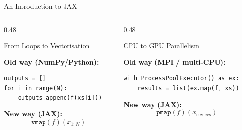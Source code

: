 \documentclass{beamer}
\begin{document}
\begin{frame}[fragile]{An Introduction to JAX}
\begin{columns}[T,totalwidth=\textwidth]
\begin{column}{0.48\textwidth}
\begin{block}{From Loops to Vectorisation}
\scriptsize

\textbf{Old way (NumPy/Python):}
\vspace{-0.5em}
\begin{verbatim}
outputs = []
for i in range(N):
    outputs.append(f(xs[i]))
\end{verbatim}
\vspace{-0.5em}
\textbf{New way (JAX):}
\vspace{-0.5em}
\[
\texttt{vmap}(f)(x_{1:N})
\]
\vspace{-1.5em}
\end{block}
\end{column}

\begin{column}{0.48\textwidth}
\begin{block}{CPU to GPU Parallelism}
\scriptsize

\textbf{Old way (MPI / multi-CPU):}

\begin{verbatim}
with ProcessPoolExecutor() as ex:
    results = list(ex.map(f, xs))
\end{verbatim}

\textbf{New way (JAX):}
\vspace{-0.5em}
\[
\texttt{pmap}(f)(x_{\text{devices}})
\]
\end{block}
\end{column}
\end{columns}
\end{frame}
\end{document}
